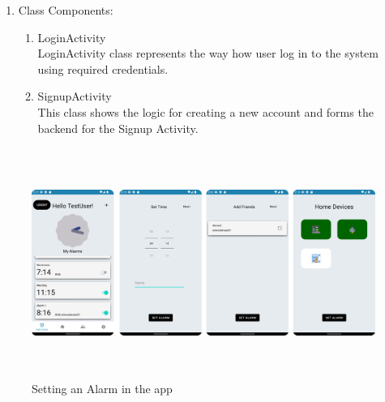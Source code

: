 \documentclass[conference]{IEEEtran}
\begin{document}
\begin{enumerate}
\begin{itemize}
    \end{itemize} 
    \item Class Components:
    \begin{enumerate}
        \item LoginActivity \\
            LoginActivity class represents the way how user log in to the system using required credentials.
        \item SignupActivity \\
            This class shows the logic for creating a new account and forms the backend for the Signup Activity. 
        
    \end{enumerate}
\end{enumerate}

    \begin{figure}[!b]
        \centerline{\includegraphics[height=75mm,scale=0.8]{Images/App_SettingAlarm.png}}
        \caption{Setting an Alarm in the app}
        \label{fig}  
    \end{figure}
\end{document}
